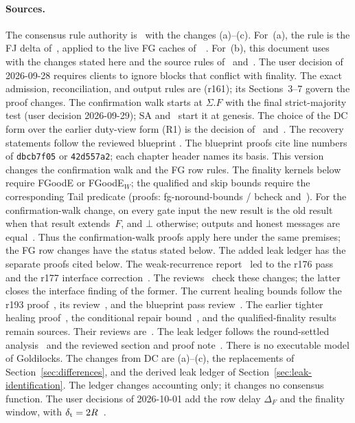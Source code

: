 \documentclass{article}
\theoremstyle{plain}
\theoremstyle{definition}
\theoremstyle{remark}
\newcommand{\DC}[1]{\cite[\S#1]{DC}}
\newcommand{\SAS}{\cite{SAS}}
\newcommand{\ADJ}[1]{\cite[\S#1]{ADJ}}
\newcommand{\FAST}[1]{\cite[\S#1]{FAST}}
\newcommand{\FJ}[1]{\cite[\S#1]{FJ}}
\newcommand{\LDP}[1]{\cite[\S#1]{LDP}}
\newcommand{\LV}[1]{\cite[\S#1]{LV}}
\begin{document}
\paragraph{Sources.}
The consensus rule authority is~\DC{7} with the changes (a)--(c).  For~(a),
the rule is the FJ delta of~\FJ{2}, applied to the live FG caches
of~\cite{DC}~\LDP{1}.  For~(b), this document uses~\SAS{} with the changes stated here and the
source rules of~\FAST{3} and~\ADJ{2}.  The user decision of
2026-09-28 requires clients to ignore blocks that conflict with finality.
The exact admission, reconciliation, and output rules are
\cite[\S2]{FB} (r161); its Sections~3--7 govern the proof changes.
The confirmation walk starts at $\Sigma.F$ with the final
strict-majority test (user decision 2026-09-29); SA and~\cite[\S2]{FB}
start it at genesis.  The choice of the DC form over the
earlier duty-view form (R1) is the decision of~\LDP{1} and~\LV{2,7}.
The recovery statements follow the reviewed blueprint
\cite{BPO,BPH,BPF}.  The blueprint proofs cite line numbers of \texttt{dbcb7f05} or
\texttt{42d557a2}; each chapter header names its basis.  This version changes the confirmation walk and the FG row rules.
The finality kernels below require FGoodE or FGoodE$_W$; the qualified and skip bounds require the corresponding Tail predicate (proofs: fg-noround-bounds / bcheck and~\cite[\S5]{FW}).  For the confirmation-walk change, on every gate
input the new result is the old result when that result extends~$F$,
and $\bot$ otherwise; outputs and honest messages are
equal~\cite{GF208,GF208R}.  Thus the confirmation-walk proofs apply here under the same
premises; the FG row changes have the status stated below.  The added
leak ledger has the separate proofs cited below.  The weak-recurrence report~\cite{WR174} led to
the r176 pass~\cite{BP176} and the r177 interface correction~\cite{BP177}.
The reviews~\cite{BPR,BPHR} check these changes; the latter closes the
interface finding of the former.  The current healing bounds follow the
r193 proof~\cite{HG193}, its review~\cite{HGR}, and the blueprint pass
review~\cite{BPR197}.  The earlier tighter healing proof~\cite{TH178},
the conditional repair bound~\cite{OR180}, and the qualified-finality
results~\cite{QF181} remain sources.  Their reviews are~\cite{THR,BBR,QFR}.  The leak ledger follows
the round-settled analysis~\cite{RL179,RLR} and the reviewed section
and proof note~\cite{LS183,LSR}.
There is no executable model of Goldilocks.  The changes from DC are
(a)--(c), the replacements of Section~\ref{sec:differences}, and the
derived leak ledger of Section~\ref{sec:leak-identification}.
The ledger changes accounting only; it changes no consensus function.
The user decisions of 2026-10-01 add the row delay $\Delta_F$ and
the finality window, with $\delta_{\rm t}=2R$~\cite{RD,FW}.
\end{document}
